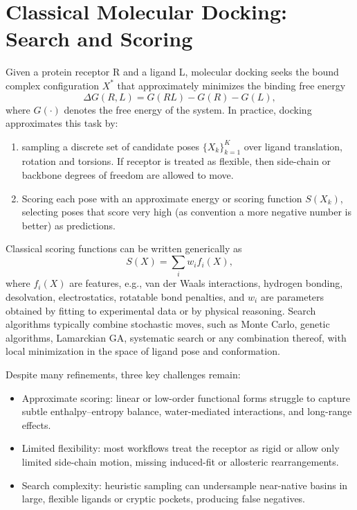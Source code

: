 \documentclass[12pt]{article}
\begin{document}
\section{Classical Molecular Docking: Search and Scoring}

Given a protein receptor R and a ligand L, molecular docking seeks the bound complex configuration $X^{\ast}$ that approximately minimizes the binding free energy
\[
\Delta G(R,L) = G(RL) - G(R) - G(L),
\]
where $G(\cdot)$ denotes the free energy of the system. In practice, docking approximates this task by:
\begin{enumerate}
  \item sampling a discrete set of candidate poses $\{X_k\}_{k=1}^{K}$ over ligand translation, rotation and torsions. If receptor is treated as flexible, then side-chain or backbone degrees of freedom are allowed to move.
  \item Scoring each pose with an approximate energy or scoring function $S(X_k)$, selecting poses that score very high (as convention a more negative number is better) as predictions.
\end{enumerate}

Classical scoring functions can be written generically as
\[
S(X) = \sum_{i} w_i f_i(X),
\]
where $f_i(X)$ are features, e.g., van der Waals interactions, hydrogen bonding, desolvation, electrostatics, rotatable bond penalties, and $w_i$ are parameters obtained by fitting to experimental data or by physical reasoning. Search algorithms typically combine stochastic moves, such as Monte Carlo, genetic algorithms, Lamarckian GA, systematic search or any combination thereof, with local minimization in the space of ligand pose and conformation.

Despite many refinements, three key challenges remain:
\begin{itemize}
  \item Approximate scoring: linear or low-order functional forms struggle to capture subtle enthalpy–entropy balance, water-mediated interactions, and long-range effects.
  \item Limited flexibility: most workflows treat the receptor as rigid or allow only limited side-chain motion, missing induced-fit or allosteric rearrangements.
  \item Search complexity: heuristic sampling can undersample near-native basins in large, flexible ligands or cryptic pockets, producing false negatives.
\end{itemize}
\end{document}
